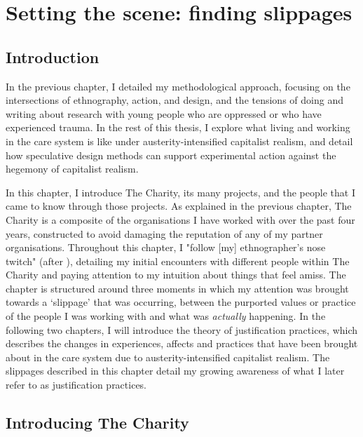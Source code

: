 \chapter{Setting the scene: finding slippages}
\label{ch:4}

\section{Introduction}
\label{sec:4-intro}

In the previous chapter, I detailed my methodological approach, focusing on the intersections of ethnography, action, and design, and the tensions of doing and writing about research with young people who are oppressed or who have experienced trauma. In the rest of this thesis, I explore what living and working in the care system is like under austerity-intensified capitalist realism, and detail how speculative design methods can support experimental action against the hegemony of capitalist realism. 

In this chapter, I introduce The Charity, its many projects, and the people that I came to know through those projects. As explained in the previous chapter, The Charity is a composite of the organisations I have worked with over the past four years, constructed to avoid damaging the reputation of any of my partner organisations. Throughout this chapter, I "follow [my] ethnographer’s nose twitch" (after \cite{leigh_star_this_2010}), detailing my initial encounters with different people within The Charity and paying attention to my intuition about things that feel amiss. The chapter is structured around three moments in which my attention was brought towards a `slippage' \citep{cutting_making_2021} that was occurring, between the purported values or practice of the people I was working with and what was \textit{actually} happening. In the following two chapters, I will introduce the theory of justification practices, which describes the changes in experiences, affects and practices that have been brought about in the care system due to austerity-intensified capitalist realism. The slippages described in this chapter detail my growing awareness of what I later refer to as justification practices.

\section{Introducing The Charity}

